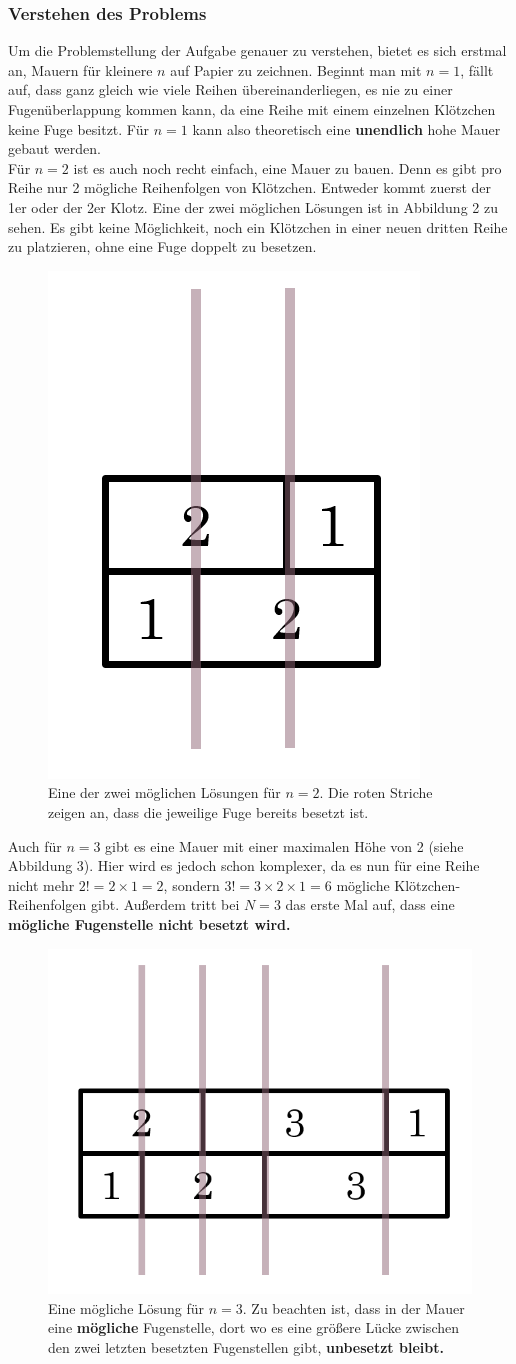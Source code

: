 \documentclass[a4paper,12pt]{article}
\begin{document}
\subsubsection{Verstehen des Problems}
Um die Problemstellung der Aufgabe genauer zu verstehen, bietet es sich erstmal an, Mauern für kleinere $n$ auf Papier zu zeichnen.
Beginnt man mit $n = 1$, fällt auf, dass ganz gleich wie viele Reihen übereinanderliegen, es nie zu einer Fugenüberlappung kommen kann, da eine Reihe mit einem einzelnen Klötzchen keine Fuge besitzt.
Für $n = 1$ kann also theoretisch eine \textbf{unendlich} hohe Mauer gebaut werden.
\\[0.4cm]
Für $n = 2$ ist es auch noch recht einfach, eine Mauer zu bauen. Denn es gibt pro Reihe nur 2 mögliche Reihenfolgen von Klötzchen. Entweder kommt zuerst der 1er oder der 2er Klotz. 
Eine der zwei möglichen Lösungen ist in Abbildung 2 zu sehen. Es gibt keine Möglichkeit, noch ein Klötzchen in einer neuen dritten Reihe zu platzieren, ohne eine Fuge doppelt zu besetzen.
\begin{figure}[H]
    \centering
    \includegraphics[width=0.3\linewidth]{Bilder/Aufgabe1/Loesung_N2.png}
    \caption{Eine der zwei möglichen Lösungen für $n = 2$. Die roten Striche zeigen an, dass die jeweilige Fuge bereits besetzt ist.}
\end{figure}

Auch für $n = 3$ gibt es eine Mauer mit einer maximalen Höhe von 2 (siehe Abbildung 3). Hier wird es jedoch schon komplexer, da es nun für eine Reihe nicht mehr $2! = 2\times1 = 2$, sondern $3! = 3\times2\times1 = 6$ mögliche Klötzchen-Reihenfolgen gibt.
Außerdem tritt bei $N = 3$ das erste Mal auf, dass eine \textbf{mögliche Fugenstelle nicht besetzt wird.}
\begin{figure}[H]
    \centering
    \includegraphics[width=0.5\linewidth]{Bilder/Aufgabe1/Loesung_N3.png}
    \caption{Eine mögliche Lösung für $n = 3$. Zu beachten ist, dass in der Mauer eine \textbf{mögliche} Fugenstelle, dort wo es eine größere Lücke zwischen den zwei letzten besetzten Fugenstellen gibt, \textbf{unbesetzt bleibt.}}
\end{figure}
\end{document}
